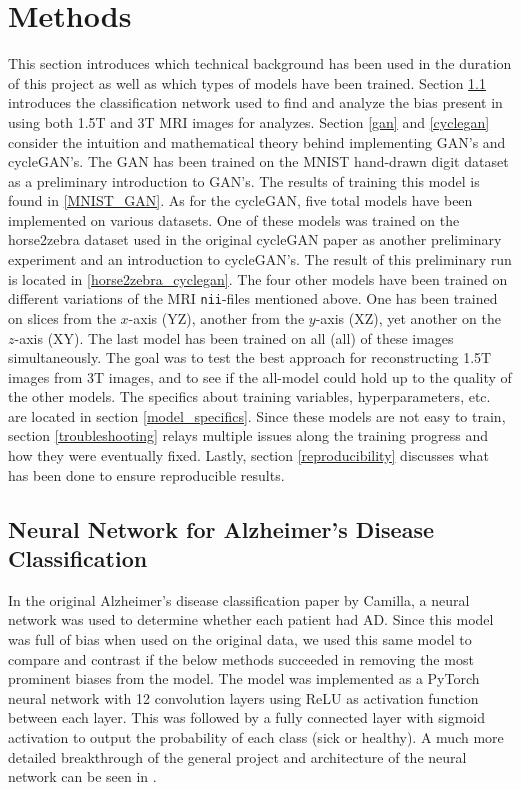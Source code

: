 \documentclass[12pt, fleqn, titlepage]{article}
\begin{document}
\section{Methods}
This section introduces which technical background has been used in the duration of this project as well as which types of models have been trained. Section \ref{camillas_model} introduces the classification network used to find and analyze the bias present in using both 1.5T and 3T MRI images for analyzes. Section \ref{gan} and \ref{cyclegan} consider the intuition and mathematical theory behind implementing GAN's and cycleGAN's. The GAN has been trained on the MNIST hand-drawn digit dataset as a preliminary introduction to GAN's. The results of training this model is found in \ref{MNIST_GAN}. As for the cycleGAN, five total models have been implemented on various datasets. One of these models was trained on the horse2zebra dataset used in the original cycleGAN paper\cite{original_cyclegan} as another preliminary experiment and an introduction to cycleGAN's. The result of this preliminary run is located in \ref{horse2zebra_cyclegan}. The four other models have been trained on different variations of the MRI \texttt{nii}-files mentioned above. One has been trained on slices from the $x$-axis (YZ), another from the $y$-axis (XZ), yet another on the $z$-axis (XY). The last model has been trained on all (all) of these images simultaneously. The goal was to test the best approach for reconstructing 1.5T images from 3T images, and to see if the all-model could hold up to the quality of the other models. The specifics about training variables, hyperparameters, etc. are located in section \ref{model_specifics}. Since these models are not easy to train\cite{hard_to_train}, section \ref{troubleshooting} relays multiple issues along the training progress and how they were eventually fixed. Lastly, section \ref{reproducibility} discusses what has been done to ensure reproducible results.

\subsection{Neural Network for Alzheimer's Disease Classification} \label{camillas_model}
In the original Alzheimer's disease classification paper by Camilla, a neural network was used to determine whether each patient had AD. Since this model was full of bias when used on the original data, we used this same model to compare and contrast if the below methods succeeded in removing the most prominent biases from the model. The model was implemented as a PyTorch neural network with 12 convolution layers using ReLU as activation function between each layer. This was followed by a fully connected layer with sigmoid activation to output the probability of each class (sick or healthy). A much more detailed breakthrough of the general project and architecture of the neural network can be seen in \cite{CamillaKandidat}.
\end{document}
